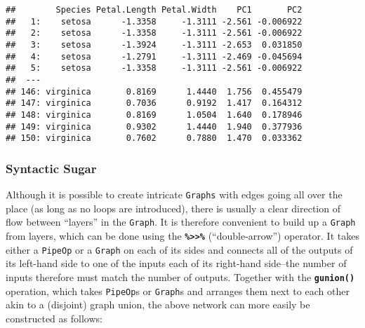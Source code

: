 \documentclass[
]{scrbook}
\newenvironment{Shaded}{\begin{snugshade}}{\end{snugshade}}
\newcommand{\AttributeTok}[1]{\textcolor[rgb]{0.77,0.63,0.00}{#1}}
\newcommand{\ConstantTok}[1]{\textcolor[rgb]{0.00,0.00,0.00}{#1}}
\newcommand{\DecValTok}[1]{\textcolor[rgb]{0.00,0.00,0.81}{#1}}
\newcommand{\FunctionTok}[1]{\textcolor[rgb]{0.00,0.00,0.00}{#1}}
\newcommand{\NormalTok}[1]{#1}
\newcommand{\OtherTok}[1]{\textcolor[rgb]{0.56,0.35,0.01}{#1}}
\newcommand{\SpecialCharTok}[1]{\textcolor[rgb]{0.00,0.00,0.00}{#1}}
\newcommand{\StringTok}[1]{\textcolor[rgb]{0.31,0.60,0.02}{#1}}
\renewenvironment{Shaded} {\begin{snugshade}\small} {\end{snugshade}}
\begin{document}
\begin{verbatim}
##        Species Petal.Length Petal.Width    PC1       PC2
##   1:    setosa      -1.3358     -1.3111 -2.561 -0.006922
##   2:    setosa      -1.3358     -1.3111 -2.561 -0.006922
##   3:    setosa      -1.3924     -1.3111 -2.653  0.031850
##   4:    setosa      -1.2791     -1.3111 -2.469 -0.045694
##   5:    setosa      -1.3358     -1.3111 -2.561 -0.006922
##  ---                                                    
## 146: virginica       0.8169      1.4440  1.756  0.455479
## 147: virginica       0.7036      0.9192  1.417  0.164312
## 148: virginica       0.8169      1.0504  1.640  0.178946
## 149: virginica       0.9302      1.4440  1.940  0.377936
## 150: virginica       0.7602      0.7880  1.470  0.033362
\end{verbatim}

\hypertarget{syntactic-sugar}{%
\subsubsection{Syntactic Sugar}\label{syntactic-sugar}}

Although it is possible to create intricate \texttt{Graphs} with edges going all over the place (as long as no loops are introduced), there is usually a clear direction of flow between ``layers'' in the \texttt{Graph}.
It is therefore convenient to build up a \texttt{Graph} from layers, which can be done using the \textbf{\texttt{\%\textgreater{}\textgreater{}\%}} (``double-arrow'') operator.
It takes either a \texttt{PipeOp} or a \texttt{Graph} on each of its sides and connects all of the outputs of its left-hand side to one of the inputs each of its right-hand side--the number of inputs therefore must match the number of outputs.
Together with the \textbf{\texttt{gunion()}} operation, which takes \texttt{PipeOp}s or \texttt{Graph}s and arranges them next to each other akin to a (disjoint) graph union, the above network can more easily be constructed as follows:

\begin{Shaded}
\end{Shaded}
\end{document}
